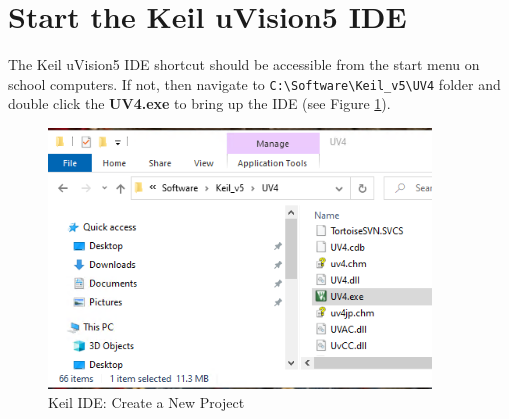 \section{Start the Keil uVision5 IDE}
The Keil uVision5 IDE shortcut should be accessible from the start menu on school computers. If not, then navigate to \verb+C:\Software\Keil_v5\UV4+ folder and double click the {\bf UV4.exe} to bring up the IDE (see Figure \ref{fig_ide_uv5_location}). 
\begin{figure}[ht!]
\centerline{\includegraphics[width=4in]{figure/uv5/IDE_uv5_location}}
\caption{Keil IDE: Create a New Project} 
\label{fig_ide_uv5_location}
\end{figure}

